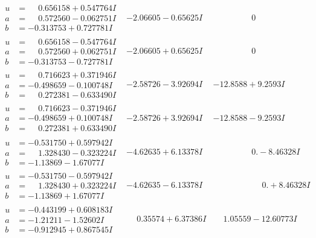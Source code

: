 \documentclass[1p]{elsarticle_modified}
\theoremstyle{definition}
\begin{document}
$$\begin{array}{c|c|c}
\begin{aligned}
u &= \phantom{-}0.656158 + 0.547764 I \\
a &= \phantom{-}0.572560 - 0.062751 I \\
b &= -0.313753 + 0.727781 I\end{aligned}
 & -2.06605 - 0.65625 I & \phantom{-0.000000 } 0 \\ \hline\begin{aligned}
u &= \phantom{-}0.656158 - 0.547764 I \\
a &= \phantom{-}0.572560 + 0.062751 I \\
b &= -0.313753 - 0.727781 I\end{aligned}
 & -2.06605 + 0.65625 I & \phantom{-0.000000 } 0 \\ \hline\begin{aligned}
u &= \phantom{-}0.716623 + 0.371946 I \\
a &= -0.498659 - 0.100748 I \\
b &= \phantom{-}0.272381 - 0.633490 I\end{aligned}
 & -2.58726 - 3.92694 I & -12.8588 + 9.2593 I \\ \hline\begin{aligned}
u &= \phantom{-}0.716623 - 0.371946 I \\
a &= -0.498659 + 0.100748 I \\
b &= \phantom{-}0.272381 + 0.633490 I\end{aligned}
 & -2.58726 + 3.92694 I & -12.8588 - 9.2593 I \\ \hline\begin{aligned}
u &= -0.531750 + 0.597942 I \\
a &= \phantom{-}1.328430 - 0.323224 I \\
b &= -1.13869 - 1.67077 I\end{aligned}
 & -4.62635 + 6.13378 I & \phantom{-0.000000 } 0. - 8.46328 I \\ \hline\begin{aligned}
u &= -0.531750 - 0.597942 I \\
a &= \phantom{-}1.328430 + 0.323224 I \\
b &= -1.13869 + 1.67077 I\end{aligned}
 & -4.62635 - 6.13378 I & \phantom{-0.000000 -}0. + 8.46328 I \\ \hline\begin{aligned}
u &= -0.443199 + 0.608183 I \\
a &= -1.21211 - 1.52602 I \\
b &= -0.912945 + 0.867545 I\end{aligned}
 & \phantom{-}0.35574 + 6.37386 I & \phantom{-}1.05559 - 12.60773 I \\ \hline\begin{aligned}

\end{aligned}
\end{array}$$
\end{document}
